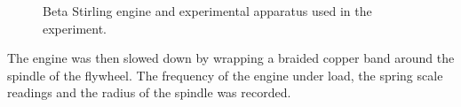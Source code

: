 \documentclass[9pt,twocolumn,twoside]{osajnl}
\begin{document}
\begin{figure}[htbp]
\centering
{}
\caption{Beta Stirling engine and experimental apparatus used in the experiment.}
\label{fig:experimentdiagram}
\end{figure}

The engine was then slowed down by wrapping a braided copper band around the spindle of the flywheel. The frequency of the engine under load, the spring scale readings and the radius of the spindle was recorded.
\end{document}
